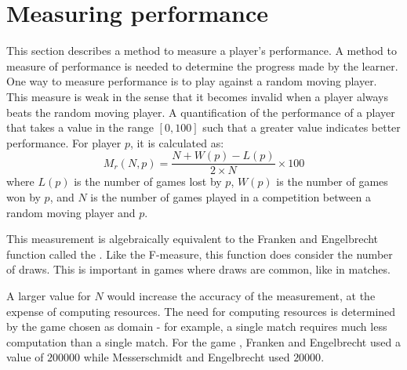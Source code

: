 \section{Measuring performance}
\label{sec:learning-performance}
This section describes a method to measure a player's performance. A method to measure of performance is needed to determine the progress made by the learner.  One way to measure performance is to play against a random moving player.  This measure is weak in the sense that it becomes invalid when a player always beats the random moving player.    
 {A quantification of the performance of a player that takes a value in the range $[0,100]$ such that a greater value indicates better performance.  For player $p$, it is calculated as:
\begin{equation}
	M_r(N,p) =  \frac{N + W(p) - L(p)}{2 \times N} \times 100
	\label{eq:performance}
\end{equation}
where $L(p)$ is the number of games lost by $p$, $W(p)$ is the number of games won by $p$, and $N$ is the number of games played in a competition between a random moving player and $p$.
}

This measurement is algebraically equivalent to the Franken and Engelbrecht \cite{franken:checkers} function called the .  Like the F-measure, this function does consider the number of draws. This is important in games where draws are common, like in  matches. 

A larger value for $N$ would increase the accuracy of the measurement, at the expense of computing resources. The need for computing resources is determined by the game chosen as domain - for example, a single  match requires much less computation than a single  match. For the game , Franken and Engelbrecht \cite{franken:checkers} used a value of $200000$ while Messerschmidt and Engelbrecht \cite{messerschmidt:learning} used $20000$.      


